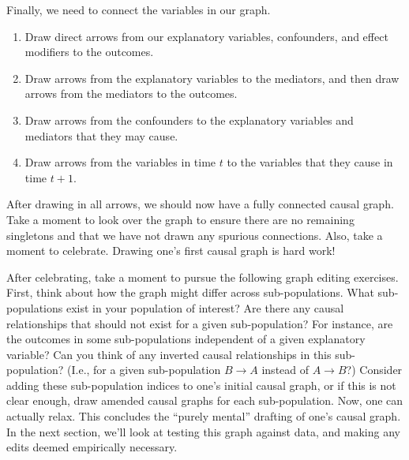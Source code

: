 Finally, we need to connect the variables in our graph.
\begin{enumerate}
   \item Draw direct arrows from our explanatory variables, confounders, and effect modifiers to the outcomes.
   \item Draw arrows from the explanatory variables to the mediators, and then draw arrows from the mediators to the outcomes.
   \item Draw arrows from the confounders to the explanatory variables and mediators that they may cause.
   \item Draw arrows from the variables in time $t$ to the variables that they cause in time $t+1$.
\end{enumerate}
After drawing in all arrows, we should now have a fully connected causal graph.
Take a moment to look over the graph to ensure there are no remaining singletons and that we have not drawn any spurious connections.
Also, take a moment to celebrate.
Drawing one's first causal graph is hard work!

After celebrating, take a moment to pursue the following graph editing exercises.
First, think about how the graph might differ across sub-populations.
What sub-populations exist in your population of interest?
Are there any causal relationships that should not exist for a given sub-population?
For instance, are the outcomes in some sub-populations independent of a given explanatory variable?
Can you think of any inverted causal relationships in this sub-population?
(I.e., for a given sub-population $B \rightarrow A$ instead of $A \rightarrow B$?)
Consider adding these sub-population indices to one's initial causal graph, or if this is not clear enough, draw amended causal graphs for each sub-population.
Now, one can actually relax.
This concludes the ``purely mental'' drafting of one's causal graph.
In the next section, we'll look at testing this graph against data, and making any edits deemed empirically necessary.
